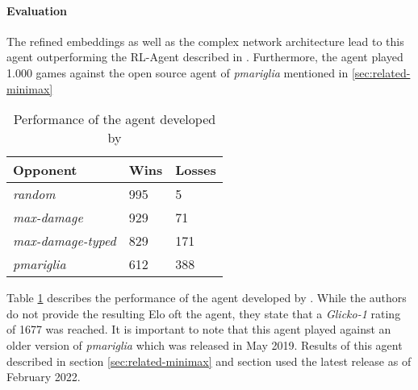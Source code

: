 \paragraph{Evaluation}
\label{sec:dqn-evaluation}
The refined embeddings as well as the complex network architecture lead to this agent outperforming
the RL-Agent described in \cite{GottaTrainEmAll}. Furthermore, the agent played 1.000 games against
the open source agent of \textit{pmariglia} mentioned in \ref{sec:related-minimax}
\begin{table}[h]
    \centering
        \begin{tabular}{|l|l|l|}
            \hline
            \textbf{Opponent} & \textbf{Wins} & \textbf{Losses} \\
            \hline
            \emph{random} & 995 & 5 \\
            \hline
            \emph{max-damage} & 929 & 71 \\
            \hline
            \emph{max-damage-typed} & 829 & 171 \\
            \hline
            \emph{pmariglia} & 612 & 388 \\
            \hline
        \end{tabular}
        \caption{Performance of the agent developed by \cite{Huang_Lee_2019}}
        \label{tbl:State-Of-The-Art-Results}
\end{table} 
Table \ref{tbl:State-Of-The-Art-Results} describes the performance of the agent developed by
\cite{Huang_Lee_2019}.
While the authors do not provide the resulting Elo oft the agent, they state that a 
\textit{Glicko-1} rating of 1677 was reached. It is important to note that this agent played
against an older version of \textit{pmariglia} which was released in May 2019. Results
of this agent described in section \ref{sec:related-minimax} and section  
used the latest release as of February 2022.

